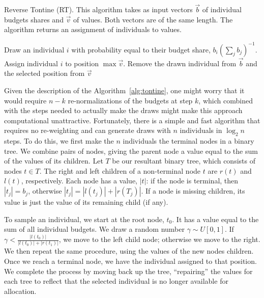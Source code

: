 \documentclass[prodmode,acmec]{acmsmall}
\begin{document}
\begin{algorithm} 
\caption{Reverse Tontine (RT). This algorithm takes as input vectors
  $\vec{b}$ of individual budgets shares and $\vec{v}$ of values. Both
  vectors are of the same length. The algorithm returns an assignment
  of individuals to values.}
\label{alg:tontine}

\begin{algorithmic}
\STATE Draw an individual $i$ with probability equal to their budget share,
$b_i \left(\sum_j b_j\right)^{-1}$. 
\STATE Assign individual $i$ to position $\max \vec
v$. 
\STATE Remove the drawn individual from $\vec b$ and the selected position
from $\vec v$ 
\ENDWHILE
\end{algorithmic}
\end{algorithm} 


Given the description of the Algorithm~\ref{alg:tontine}, one might
worry that it would require $n-k$ re-normalizations of the budgets at
step $k$, which combined with the steps needed to actually make the
draws might make this approach computational
unattractive. Fortunately, there is a simple and fast algorithm that
requires no re-weighting and can generate draws with $n$ individuals
in $\log_2 n$ steps. To do this, we first make the $n$ individuals
the terminal nodes in a binary tree. We combine pairs of nodes, giving
the parent node a value equal to the sum of the values of its
children. Let $T$ be our resultant binary tree, which consists of
nodes $t \in T$. The right and left children of a non-terminal node
$t$ are $r(t)$ and $l(t)$, respectively. Each node has a value, $|t|$:
if the node is terminal, then $|t_j| = b_j$, otherwise $|t_j| =
|l(t_j)| + |r(T_j)|$. If a node is missing children, its value is just
the value of its remaining child (if any).

To sample an individual, we start at the root node, $t_0$. It has a
value equal to the sum of all individual budgets. We draw a random
number $\gamma \sim U[0,1]$. If $\gamma < \frac{|l(t_0)|}{|l(t_0)| +
  |r(t_1)|}$, we move to the left child node; otherwise we move to the
right. We then repeat the same procedure, using the values of the new
nodes children. Once we reach a terminal node, we have the individual
assigned to that position. We complete the process by moving back up
the tree, ``repairing'' the values for each tree to reflect that the
selected individual is no longer available for allocation.
\end{document}
